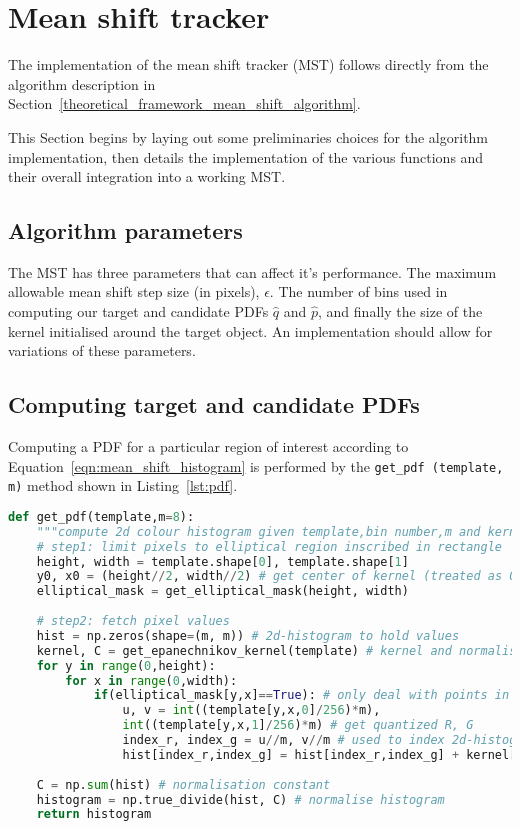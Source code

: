 \section{Mean shift tracker}\label{implementation_mean_shift_tracker}
The implementation of the mean shift tracker (MST) follows directly from the algorithm
description in Section~\ref{theoretical_framework_mean_shift_algorithm}.

This Section begins by laying out some preliminaries choices for the algorithm
implementation, then details the implementation of the various functions and
their overall integration into a working MST\@. 

\subsection{Algorithm parameters}
The MST has three parameters that can affect it's performance.
The maximum allowable mean shift step size (in pixels), $\epsilon$. The number
of bins used in computing our target and candidate PDFs $\hat{q}$ and
$\hat{p}$, and finally the size of the kernel initialised around the target
object.
An implementation should allow for variations of these parameters.

\subsection{Computing target and candidate PDFs}
Computing a PDF for a particular region of interest according to 
Equation~\ref{eqn:mean_shift_histogram} is performed by the \lstinline{get_pdf (template, m)} 
method shown in Listing~\ref{lst:pdf}.

\begin{lstlisting}[language=Python, caption={Function computing the PDF}, captionpos=b, label={lst:pdf}]
def get_pdf(template,m=8):
    """compute 2d colour histogram given template,bin number,m and kernel function"""
    # step1: limit pixels to elliptical region inscribed in rectangle
    height, width = template.shape[0], template.shape[1]
    y0, x0 = (height//2, width//2) # get center of kernel (treated as 0,0) == hy and hx 
    elliptical_mask = get_elliptical_mask(height, width)
       
    # step2: fetch pixel values
    hist = np.zeros(shape=(m, m)) # 2d-histogram to hold values 
    kernel, C = get_epanechnikov_kernel(template) # kernel and normalisation constant, C
    for y in range(0,height):
        for x in range(0,width): 
            if(elliptical_mask[y,x]==True): # only deal with points in the mask
                u, v = int((template[y,x,0]/256)*m),
                int((template[y,x,1]/256)*m) # get quantized R, G
                index_r, index_g = u//m, v//m # used to index 2d-histogram
                hist[index_r,index_g] = hist[index_r,index_g] + kernel[y,x] # add weighted point
    
    C = np.sum(hist) # normalisation constant
    histogram = np.true_divide(hist, C) # normalise histogram
    return histogram 
\end{lstlisting}

